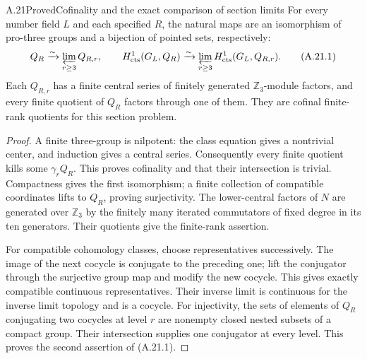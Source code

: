 \begin{statement}{A.21}{Proved}{Cofinality and the exact comparison of section limits}
For every number field $L$ and each specified $R$, the natural
maps are an isomorphism of pro-three groups and a bijection of
pointed sets, respectively:
\[
 Q_R\xrightarrow{\sim}\varprojlim_{r\ge3}Q_{R,r},\qquad
 H^1_{\mathrm{cts}}(G_L,Q_R)\xrightarrow{\sim}
 \varprojlim_{r\ge3}H^1_{\mathrm{cts}}(G_L,Q_{R,r}).    \tag{A.21.1}
\]
Each $Q_{R,r}$ has a finite central series of finitely generated
$\mathbb Z_3$-module factors, and every finite quotient of $Q_R$
factors through one of them. They are cofinal finite-rank
quotients for this section problem.
\end{statement}
\begin{proof}
A finite three-group is nilpotent: the class equation gives a
nontrivial center, and induction gives a central series.
Consequently every finite quotient kills some $\gamma_rQ_R$.
This proves cofinality and that their intersection is trivial.
Compactness gives the first isomorphism; a finite collection
of compatible coordinates lifts to $Q_R$, proving surjectivity.
The lower-central factors of $N$ are generated over $\mathbb Z_3$
by the finitely many iterated commutators of fixed degree in its
ten generators. Their quotients give the finite-rank assertion.

For compatible cohomology classes, choose representatives
successively. The image of the next cocycle is conjugate to
the preceding one; lift the conjugator through the surjective
group map and modify the new cocycle. This gives exactly
compatible continuous representatives. Their inverse limit
is continuous for the inverse limit topology and is a cocycle.
For injectivity, the sets of elements of $Q_R$ conjugating two
cocycles at level $r$ are nonempty closed nested subsets of a
compact group. Their intersection supplies one conjugator at
every level. This proves the second assertion of (A.21.1).
\end{proof}

